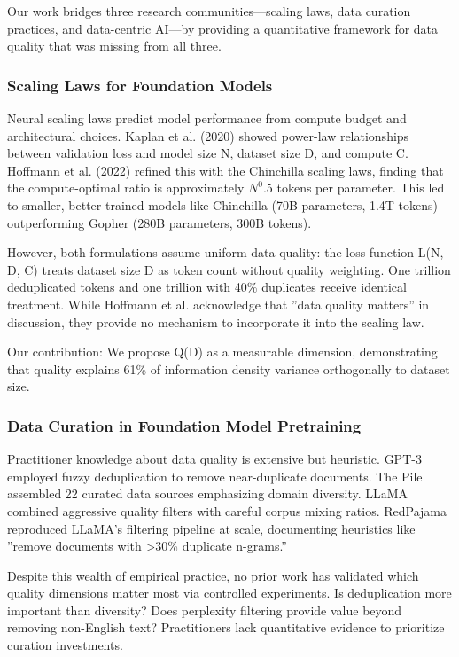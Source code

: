 
Our work bridges three research communities---scaling laws, data curation practices, and data-centric AI---by providing a quantitative framework for data quality that was missing from all three.

\subsubsection{Scaling Laws for Foundation Models}

Neural scaling laws predict model performance from compute budget and architectural choices. Kaplan et al. (2020) showed power-law relationships between validation loss and model size N, dataset size D, and compute C. Hoffmann et al. (2022) refined this with the Chinchilla scaling laws, finding that the compute-optimal ratio is approximately $N^0$.5 tokens per parameter. This led to smaller, better-trained models like Chinchilla (70B parameters, 1.4T tokens) outperforming Gopher (280B parameters, 300B tokens).

However, both formulations assume uniform data quality: the loss function L(N, D, C) treats dataset size D as token count without quality weighting. One trillion deduplicated tokens and one trillion with 40\% duplicates receive identical treatment. While Hoffmann et al. acknowledge that ''data quality matters'' in discussion, they provide no mechanism to incorporate it into the scaling law.

Our contribution: We propose Q(D) as a measurable dimension, demonstrating that quality explains 61\% of information density variance orthogonally to dataset size.

\subsubsection{Data Curation in Foundation Model Pretraining}

Practitioner knowledge about data quality is extensive but heuristic. GPT-3 employed fuzzy deduplication to remove near-duplicate documents. The Pile assembled 22 curated data sources emphasizing domain diversity. LLaMA combined aggressive quality filters with careful corpus mixing ratios. RedPajama reproduced LLaMA's filtering pipeline at scale, documenting heuristics like ''remove documents with >30\% duplicate n-grams.''

Despite this wealth of empirical practice, no prior work has validated which quality dimensions matter most via controlled experiments. Is deduplication more important than diversity? Does perplexity filtering provide value beyond removing non-English text? Practitioners lack quantitative evidence to prioritize curation investments.

